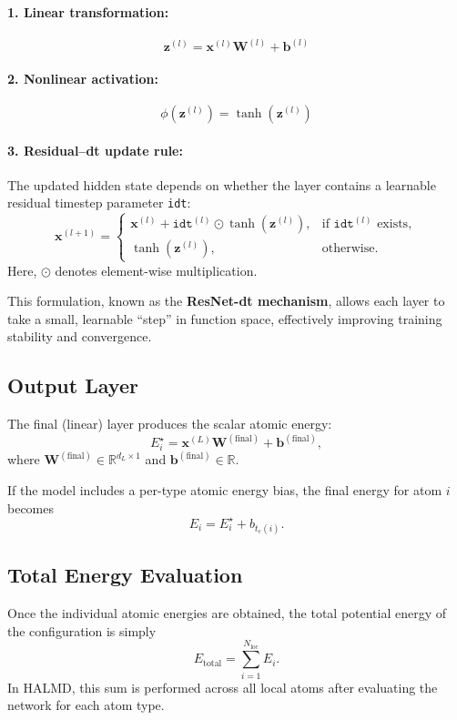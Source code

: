 \documentclass[12pt,a4paper]{article}
\begin{document}
\paragraph{1. Linear transformation:}
\[
\mathbf{z}^{(l)} = \mathbf{x}^{(l)} \mathbf{W}^{(l)} + \mathbf{b}^{(l)}
\]

\paragraph{2. Nonlinear activation:}
\[
\phi(\mathbf{z}^{(l)}) = \tanh(\mathbf{z}^{(l)})
\]

\paragraph{3. Residual–dt update rule:}
The updated hidden state depends on whether the layer contains a learnable residual timestep parameter \texttt{idt}:
\[
\mathbf{x}^{(l+1)} =
\begin{cases}
\mathbf{x}^{(l)} + \texttt{idt}^{(l)} \odot \tanh(\mathbf{z}^{(l)}), & \text{if } \texttt{idt}^{(l)} \text{ exists}, \\[6pt]
\tanh(\mathbf{z}^{(l)}), & \text{otherwise.}
\end{cases}
\]
Here, $\odot$ denotes element-wise multiplication.

This formulation, known as the \textbf{ResNet-dt mechanism}, allows each layer to take a small, learnable ``step'' in function space, effectively improving training stability and convergence.

\subsection*{Output Layer}

The final (linear) layer produces the scalar atomic energy:
\[
E_i^\star = \mathbf{x}^{(L)} \mathbf{W}^{(\text{final})} + \mathbf{b}^{(\text{final})},
\]
where $\mathbf{W}^{(\text{final})} \in \mathbb{R}^{d_L \times 1}$ and $\mathbf{b}^{(\text{final})} \in \mathbb{R}$.

If the model includes a per-type atomic energy bias, the final energy for atom $i$ becomes
\[
E_i = E_i^\star + b_{t_c(i)}.
\]

\subsection*{Total Energy Evaluation}

Once the individual atomic energies are obtained, 
the total potential energy of the configuration is simply
\[
E_{\text{total}} = \sum_{i=1}^{N_{\mathrm{loc}}} E_i.
\]
In HALMD, this sum is performed across all local atoms after evaluating the network for each atom type.
\end{document}
